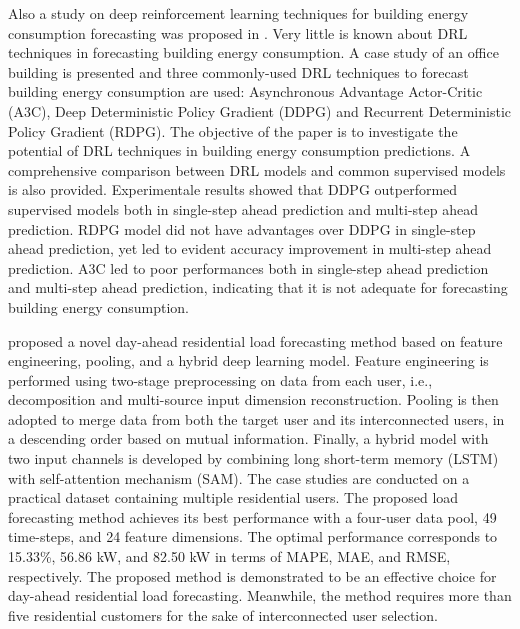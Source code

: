 Also a study on deep reinforcement learning techniques for building energy consumption forecasting was proposed in \cite{LIU2020109675}.
Very little is known about DRL techniques in forecasting building energy consumption.
A case study of an office building is presented and three commonly-used DRL techniques to forecast building energy consumption are used: Asynchronous Advantage Actor-Critic (A3C), Deep Deterministic Policy Gradient (DDPG) and Recurrent Deterministic Policy Gradient (RDPG).
The objective of the paper is to investigate the potential of DRL techniques in building energy consumption predictions.
A comprehensive comparison between DRL models and common supervised models is also provided.
Experimentale results showed that DDPG outperformed supervised models both in single-step ahead prediction and multi-step ahead prediction.
RDPG model did not have advantages over DDPG in single-step ahead prediction, yet led to evident accuracy improvement in multi-step ahead prediction.
A3C led to poor performances both in single-step ahead prediction and multi-step ahead prediction, indicating that it is not adequate for forecasting building energy consumption.

\cite{ZANG2021120682} proposed a novel day-ahead residential load forecasting method based on feature engineering, pooling, and a hybrid deep learning model.
Feature engineering is performed using two-stage preprocessing on data from each user, i.e., decomposition and multi-source input dimension reconstruction.
Pooling is then adopted to merge data from both the target user and its interconnected users, in a descending order based on mutual information.
Finally, a hybrid model with two input channels is developed by combining long short-term memory (LSTM) with self-attention mechanism (SAM).
The case studies are conducted on a practical dataset containing multiple residential users.
The proposed load forecasting method achieves its best performance with a four-user data pool, 49 time-steps, and 24 feature dimensions.
The optimal performance corresponds to 15.33\%, 56.86 kW, and 82.50 kW in terms of MAPE, MAE, and RMSE, respectively.
The proposed method is demonstrated to be an effective choice for day-ahead residential load forecasting.
Meanwhile, the method requires more than five residential customers for the sake of interconnected user selection.

